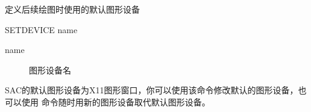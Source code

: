 \label{cmd:setdevice}

定义后续绘图时使用的默认图形设备

\begin{SACSTX}
SETDEVICE name
\end{SACSTX}

\begin{description}
\item [name] 图形设备名
\end{description}

SAC的默认图形设备为X11图形窗口，你可以使用该命令修改默认的图形设备，也可以使用
 命令随时用新的图形设备取代默认图形设备。
